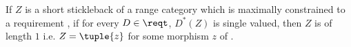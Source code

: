 \begin{corollary}
If $Z$ is a short 
stickleback  of a range category \catcw which is maximally constrained to a requirement \reqt, if for every $D \in \reqt$, $D^*(Z)$ is single valued, then
$Z$ is of length $1$ i.e. $Z=\tuple{z}$ for some morphism $z$ of \catcw.
\end{corollary}

